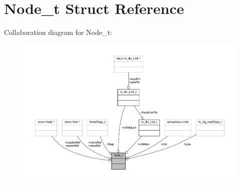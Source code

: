 \hypertarget{struct_node__t}{}\section{Node\+\_\+t Struct Reference}
\label{struct_node__t}


Collaboration diagram for Node\+\_\+t\+:
\nopagebreak
\begin{figure}[H]
\begin{center}
\leavevmode
\includegraphics[width=350pt]{struct_node__t__coll__graph}
\end{center}
\end{figure}

